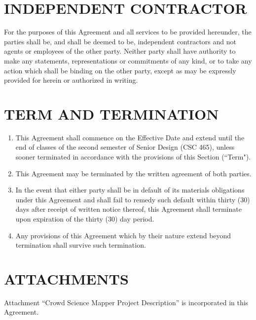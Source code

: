 \documentclass[11pt]{article}
\begin{document}
\section{INDEPENDENT CONTRACTOR}  

For the purposes of this Agreement and all services to be provided hereunder, the parties shall be, and shall be deemed to be, independent contractors and not agents or employees of the other party. Neither party shall have authority to make any statements, representations or commitments of any kind, or to take any action which shall be binding on the other party, except as may be expressly provided for herein or authorized in writing.  

\section{TERM AND TERMINATION }    
\begin{enumerate}  \itemsep4pt \parskip0pt 
\item This Agreement shall commence on the Effective Date and extend until the end of classes of the second semester of Senior Design (CSC 465), unless sooner terminated in accordance with the provisions of this Section (``Term"). 

\item This Agreement may be terminated by the written agreement of both       parties.    

\item In the event that either party shall be in default of its       materials obligations under this Agreement and shall fail to       remedy such default within thirty (30) days after receipt of       written notice thereof, this Agreement shall terminate upon       expiration of the thirty (30) day period.    

\item Any provisions of this Agreement which by their nature extend       beyond termination shall survive such termination.  
\end{enumerate}


\section{ATTACHMENTS}  

Attachment ``Crowd Science Mapper Project Description'' is incorporated in this Agreement.  
\end{document}
